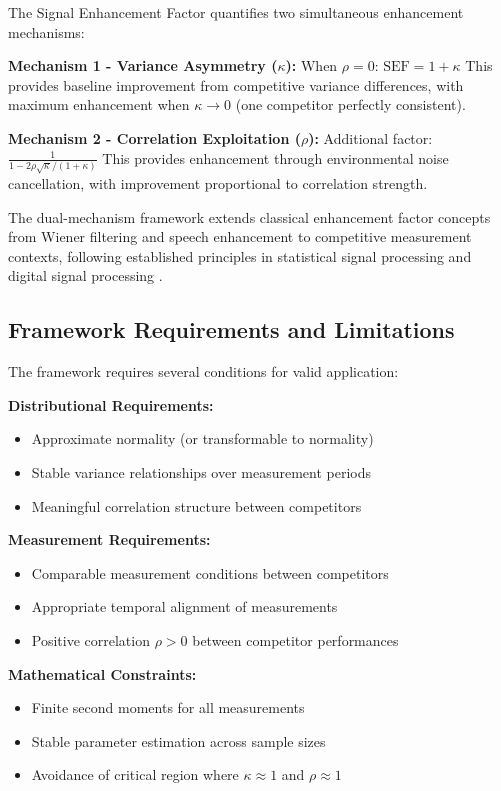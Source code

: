 The Signal Enhancement Factor quantifies two simultaneous enhancement mechanisms:

\textbf{Mechanism 1 - Variance Asymmetry ($\kappa$):}
When $\rho = 0$: $\text{SEF} = 1 + \kappa$
This provides baseline improvement from competitive variance differences, with maximum enhancement when $\kappa \to 0$ (one competitor perfectly consistent).

\textbf{Mechanism 2 - Correlation Exploitation ($\rho$):}
Additional factor: $\frac{1}{1 - 2\rho\sqrt{\kappa}/(1+\kappa)}$
This provides enhancement through environmental noise cancellation, with improvement proportional to correlation strength.

The dual-mechanism framework extends classical enhancement factor concepts from Wiener filtering \cite{hardie2007fast} and speech enhancement \cite{scalart1996speech} to competitive measurement contexts, following established principles in statistical signal processing \cite{kay1993fundamentals} and digital signal processing \cite{oppenheim2010discrete}.

\subsection{Framework Requirements and Limitations}

The framework requires several conditions for valid application:

\textbf{Distributional Requirements:}
\begin{itemize}
    \item Approximate normality (or transformable to normality)
    \item Stable variance relationships over measurement periods
    \item Meaningful correlation structure between competitors
\end{itemize}

\textbf{Measurement Requirements:}
\begin{itemize}
    \item Comparable measurement conditions between competitors
    \item Appropriate temporal alignment of measurements
    \item Positive correlation $\rho > 0$ between competitor performances
\end{itemize}

\textbf{Mathematical Constraints:}
\begin{itemize}
    \item Finite second moments for all measurements
    \item Stable parameter estimation across sample sizes
    \item Avoidance of critical region where $\kappa \approx 1$ and $\rho \approx 1$
\end{itemize}

